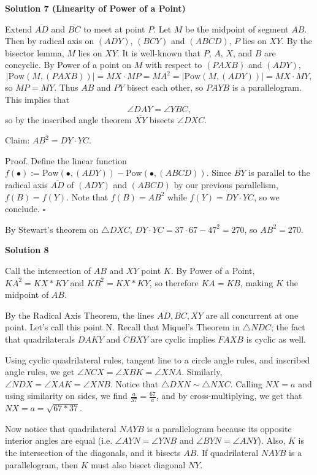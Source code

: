 \begin{enumerate}
\textbf{Solution 7 (Linearity of Power of a Point)}

Extend $\overline{AD}$ and $\overline{BC}$ to meet at point $P$. Let $M$ be the midpoint of segment $AB$. Then by radical axis on $(ADY)$, $(BCY)$ and $(ABCD)$, $P$ lies on $XY$. By the bisector lemma, $M$ lies on $XY$. It is well-known that $P$, $A$, $X$, and $B$ are concyclic. By Power of a point on $M$ with respect to $(PAXB)$ and $(ADY)$, 
 \[|\text{Pow}(M, (PAXB))| = MX \cdot MP = MA^2 = |\text{Pow}(M, (ADY))| = MX \cdot MY,\] so $MP=MY$. Thus $AB$ and $PY$ bisect each other, so $PAYB$ is a parallelogram. This implies that 
 \[\angle DAY = \angle YBC,\] so by the inscribed angle theorem $\overline{XY}$ bisects $\angle DXC$. 

 Claim: $AB^2 = DY \cdot YC$.

 Proof. Define the linear function $f(\bullet) := \text{Pow}(\bullet, (ADY)) - \text{Pow}(\bullet, (ABCD))$. Since $\overline{BY}$ is parallel to the radical axis $\overline{AD}$ of $(ADY)$ and $(ABCD)$ by our previous parallelism, $f(B)=f(Y)$. Note that $f(B)=AB^2$ while $f(Y)=DY \cdot YC$, so we  conclude. $\square$

 By Stewart's theorem on $\triangle DXC$, $DY \cdot YC=37 \cdot 67 - 47^2 = 270$, so $AB^2=\boxed{270}$. 

 



\textbf{Solution 8}

Call the intersection of $AB$ and $XY$ point $K$. By Power of a Point, $KA^2=KX*KY$ and $KB^2=KX*KY$, so therefore $KA=KB$, making $K$ the midpoint of $AB$.

 By the Radical Axis Theorem, the lines $\overline{AD}, \overline{BC}, \overline{XY}$ are all concurrent at one point. Let's call this point N. Recall that Miquel's Theorem in $\triangle NDC$; the fact that quadrilaterals $DAKY$ and $CBXY$ are cyclic implies $FAXB$ is cyclic as well.

 Using cyclic quadrilateral rules, tangent line to a circle angle rules, and inscribed angle rules, we get $\angle NCX=\angle XBK=\angle XNA$. Similarly, $\angle NDX=\angle XAK=\angle XNB$. Notice that $\triangle DXN \sim \triangle NXC$. Calling $NX=a$ and using similarity on sides, we find $\frac{a}{37}=\frac{67}{a}$, and by cross-multiplying, we get that $NX=a=\sqrt{67*37}$.

 Now notice that quadrilateral $NAYB$ is a parallelogram because its opposite interior angles are equal (i.e. $\angle AYN=\angle YNB$ and $\angle BYN=\angle ANY$). Also, $K$ is the intersection of the diagonals, and it bisects $AB$. If quadrilateral $NAYB$ is a parallelogram, then $K$ must also bisect diagonal $NY$.


\end{enumerate}
